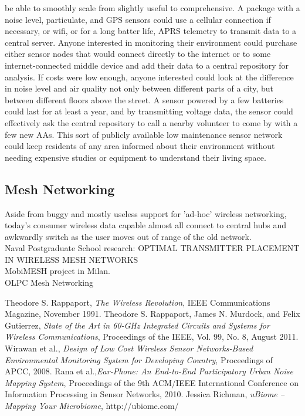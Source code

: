 \documentclass[conference]{IEEEtran}
\begin{document}
be able to smoothly scale from slightly useful to comprehensive. 
A package with a noise level, particulate, and GPS sensors could use a cellular
connection if necessary, or wifi, or for a long batter life, APRS telemetry to 
transmit data to a central server.  Anyone interested in monitoring their environment
could purchase either sensor nodes that would connect directly to the internet or
to some internet-connected middle device and add their data to a central repository
for analysis.  If costs were low enough, anyone interested could look at the
difference in noise level and air quality not only between different parts of
a city, but between different floors above the street.  A sensor powered by 
a few batteries could last for at least a year, and by transmitting voltage data, the
sensor could effectively ask the central repository to call a nearby volunteer
to come by with a few new AAs.  This sort of publicly available low maintenance
sensor network could keep residents of any area informed about their environment
without needing expensive studies or equipment to understand their living space.
\subsection{Mesh Networking}
Aside from buggy and mostly useless support for 'ad-hoc' wireless networking,
today's consumer wireless data capable almost all connect to central hubs and 
awkwardly switch as the user moves out of range of the old network. \\

Naval Postgraduate School research: OPTIMAL TRANSMITTER PLACEMENT IN WIRELESS MESH NETWORKS\\
MobiMESH project in Milan.\\
OLPC Mesh Networking

\begin{thebibliography}{1}

Theodore S. Rappaport, \emph{The Wireless Revolution}, IEEE Communications Magazine, November 1991.
Theodore S. Rappaport, James N. Murdock, and Felix Gutierrez, \emph{State of the Art in 60-GHz Integrated Circuits and Systems for Wireless Communications}, Proceedings of the IEEE, Vol. 99, No. 8, August 2011.
Wirawan et al., \emph{Design of Low Cost Wireless Sensor Networks-Based Environmental Monitoring System for Developing Country}, Proceedings of APCC, 2008.
Rana et al.,\emph{Ear-Phone: An End-to-End Participatory Urban Noise Mapping System}, Proceedings of the 9th ACM/IEEE International Conference on Information Processing in Sensor Networks, 2010.
Jessica Richman, \emph{uBiome – Mapping Your Microbiome}, http://ubiome.com/
\end{thebibliography}




\end{document}
